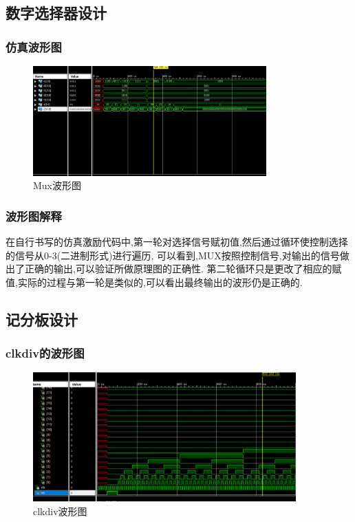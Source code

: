 \documentclass{article}
\begin{document}
\subsection{数字选择器设计}

\subsubsection*{仿真波形图}
    \begin{figure}[H]
    \centering
    \includegraphics[width=0.8\textwidth]{lab7/1.png}
    \caption{\label{Lab7}Mux波形图}
    \end{figure}

\subsubsection*{波形图解释}
在自行书写的仿真激励代码中,第一轮对选择信号赋初值,然后通过循环使控制选择的信号从0-3(二进制形式)进行遍历,
可以看到,MUX按照控制信号,对输出的信号做出了正确的输出,可以验证所做原理图的正确性.
第二轮循环只是更改了相应的赋值,实际的过程与第一轮是类似的,可以看出最终输出的波形仍是正确的.


\subsection{记分板设计}

\subsubsection{clkdiv的波形图}

    \begin{figure}[H]
    \centering
    \includegraphics[width=0.9\textwidth]{lab7/3.png}
    \caption{\label{Lab7}clkdiv波形图}
    \end{figure}
\end{document}
